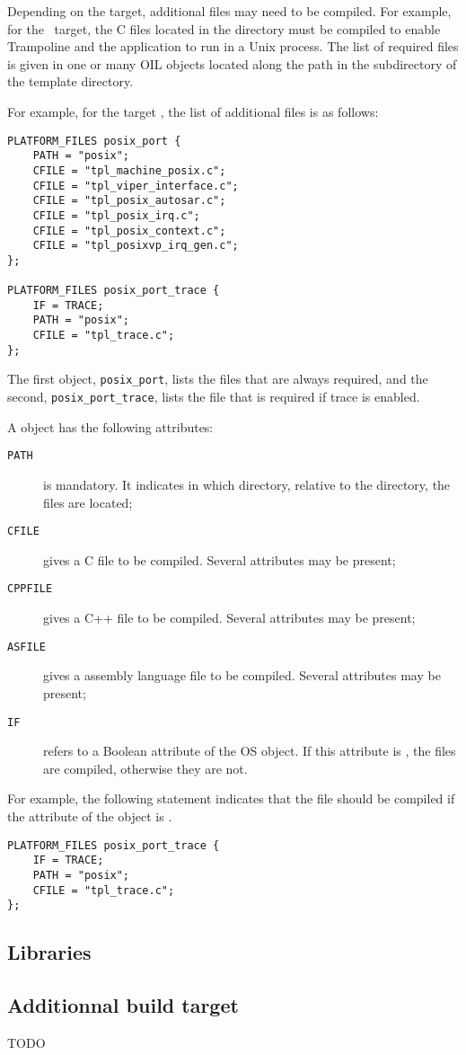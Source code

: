 Depending on the target, additional files may need to be compiled. For example, for the \posix\ target, the C files located in the  directory must be compiled to enable Trampoline and the application to run in a Unix process. The list of required files is given in one or many OIL objects located along the path in the  subdirectory of the template directory.

For example, for the target \posix, the list of additional files is as follows:

\begin{lstlisting}[language=OIL]
PLATFORM_FILES posix_port {
    PATH = "posix";
    CFILE = "tpl_machine_posix.c";
    CFILE = "tpl_viper_interface.c";
    CFILE = "tpl_posix_autosar.c";
    CFILE = "tpl_posix_irq.c";
    CFILE = "tpl_posix_context.c";
    CFILE = "tpl_posixvp_irq_gen.c";
};

PLATFORM_FILES posix_port_trace {
    IF = TRACE;
    PATH = "posix";
    CFILE = "tpl_trace.c";
};
\end{lstlisting}

The first object, \lstinline{posix_port}, lists the files that are always required, and the second, \lstinline{posix_port_trace}, lists the file  that is required if trace is enabled.

A  object has the following attributes:

\begin{description}
\item[\texttt{PATH}] is mandatory. It indicates in which directory, relative to the  directory, the files are located;
\item[\texttt{CFILE}] gives a C file to be compiled. Several  attributes may be present;
\item[\texttt{CPPFILE}] gives a C++ file to be compiled. Several  attributes may be present;
\item[\texttt{ASFILE}] gives a assembly language file to be compiled. Several  attributes may be present;
\item[\texttt{IF}] refers to a Boolean attribute of the OS object. If this attribute is , the files are compiled, otherwise they are not.
\end{description}

For example, the following statement indicates that the file  should be compiled if the  attribute of the  object is .

\begin{lstlisting}[language=OIL]
PLATFORM_FILES posix_port_trace {
    IF = TRACE;
    PATH = "posix";
    CFILE = "tpl_trace.c";
};
\end{lstlisting}


\subsection{Libraries}



\subsection{Additionnal build target}
\label{sec:additionnalTarget}
TODO
